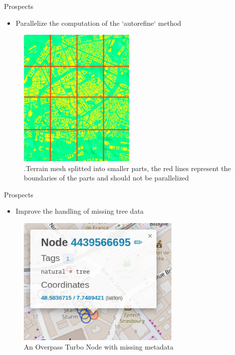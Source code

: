 \documentclass[10pt]{beamer}
\begin{document}
\begin{frame}{Prospects}
	\begin{itemize}
		\item Parallelize the computation of the `autorefine` method
	\end{itemize}

	\begin{figure}
		\centering
		\includegraphics[width=0.5\textwidth]{images/stras_cutted.png}
		\caption{.Terrain mesh splitted into smaller parts, the red lines represent the boundaries of the parts and should not be parallelized}
		\label{fig:figure1}
	\end{figure}
\end{frame}

\begin{frame}{Prospects}
	\begin{itemize}
		\item Improve the handling of missing tree data
	\end{itemize}

	\begin{figure}
		\centering
		\includegraphics[width=0.7\textwidth]{images/ovt-node-missing-data.png}
		\caption{An Overpass Turbo Node with missing metadata}
		\label{fig:figure1}
	\end{figure}
\end{frame}
\end{document}
